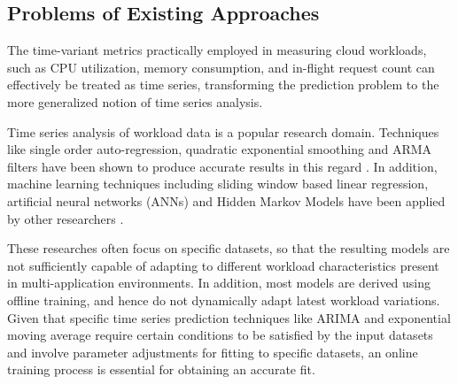 \subsection{Problems of Existing Approaches}
The time-variant metrics practically employed in measuring cloud workloads, such as CPU utilization, memory consumption, and in-flight request count can effectively be treated as time series, transforming the prediction problem to the more generalized notion of time series analysis.

Time series analysis of workload data is a popular research domain. Techniques like single order auto-regression, quadratic exponential smoothing and ARMA filters have been shown to produce accurate results in this regard \cite{Kupferman_2009} \cite{Mi_2010} \cite{Roy_2011}. In addition, machine learning techniques including sliding window based linear regression, artificial neural networks (ANNs) and Hidden Markov Models have been applied by other researchers \cite{Yang_2013} \cite{Khan_2012}.

These researches often focus on specific datasets, so that the resulting models are not sufficiently capable of adapting to different workload characteristics present in multi-application environments. In addition, most models are derived using offline training, and hence do not dynamically adapt latest workload variations. Given that specific time series prediction techniques like ARIMA and exponential moving average require certain conditions to be satisfied by the input datasets and involve parameter adjustments for fitting to specific datasets, an online training process is essential for obtaining an accurate fit.